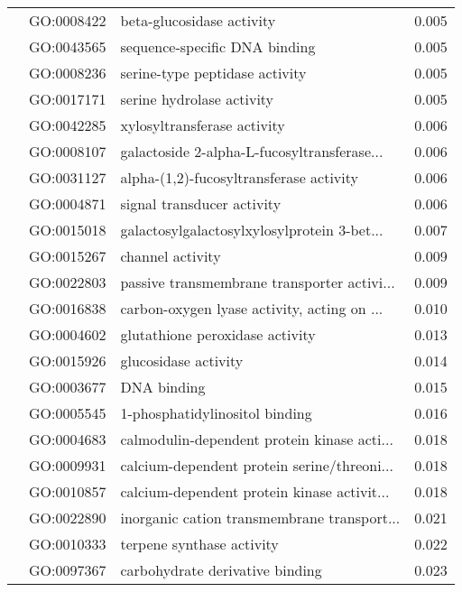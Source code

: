 \begin{longtable}{lllr}
   & GO:0008422 &                    beta-glucosidase activity &         0.005 \\
   & GO:0043565 &                sequence-specific DNA binding &         0.005 \\
   & GO:0008236 &               serine-type peptidase activity &         0.005 \\
   & GO:0017171 &                    serine hydrolase activity &         0.005 \\
   & GO:0042285 &                  xylosyltransferase activity &         0.006 \\
   & GO:0008107 &  galactoside 2-alpha-L-fucosyltransferase... &         0.006 \\
   & GO:0031127 &      alpha-(1,2)-fucosyltransferase activity &         0.006 \\
   & GO:0004871 &                   signal transducer activity &         0.006 \\
   & GO:0015018 &  galactosylgalactosylxylosylprotein 3-bet... &         0.007 \\
   & GO:0015267 &                             channel activity &         0.009 \\
   & GO:0022803 &  passive transmembrane transporter activi... &         0.009 \\
   & GO:0016838 &  carbon-oxygen lyase activity, acting on ... &         0.010 \\
   & GO:0004602 &              glutathione peroxidase activity &         0.013 \\
   & GO:0015926 &                         glucosidase activity &         0.014 \\
   & GO:0003677 &                                  DNA binding &         0.015 \\
   & GO:0005545 &               1-phosphatidylinositol binding &         0.016 \\
   & GO:0004683 &  calmodulin-dependent protein kinase acti... &         0.018 \\
   & GO:0009931 &  calcium-dependent protein serine/threoni... &         0.018 \\
   & GO:0010857 &  calcium-dependent protein kinase activit... &         0.018 \\
   & GO:0022890 &  inorganic cation transmembrane transport... &         0.021 \\
   & GO:0010333 &                    terpene synthase activity &         0.022 \\
   & GO:0097367 &              carbohydrate derivative binding &         0.023 \\

\end{longtable}
